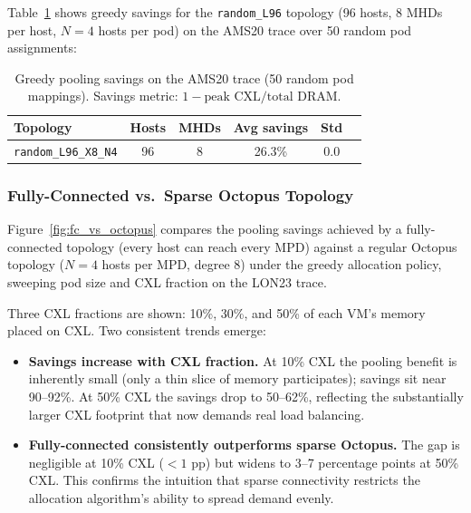 \documentclass[11pt]{article}
\begin{document}
Table~\ref{tab:random96} shows greedy savings for the \texttt{random\_L96}
topology (96 hosts, 8 MHDs per host, $N=4$ hosts per pod) on the AMS20 trace
over 50 random pod assignments:

\begin{table}[H]
\centering
\small
\begin{tabular}{lccccc}
\toprule
\textbf{Topology} & \textbf{Hosts} & \textbf{MHDs} & \textbf{Avg savings} & \textbf{Std} \\
\midrule
\texttt{random\_L96\_X8\_N4} & 96 & 8 & 26.3\% & 0.0 \\
\bottomrule
\end{tabular}
\caption{Greedy pooling savings on the AMS20 trace (50 random pod mappings).
Savings metric: $1 - \text{peak CXL}/\text{total DRAM}$.}
\label{tab:random96}
\end{table}

\subsubsection*{Fully-Connected vs.\ Sparse Octopus Topology}

Figure~\ref{fig:fc_vs_octopus} compares the pooling savings achieved by a
fully-connected topology (every host can reach every MPD) against a regular
Octopus topology ($N = 4$ hosts per MPD, degree 8) under the greedy
allocation policy, sweeping pod size and CXL fraction on the LON23 trace.

Three CXL fractions are shown: 10\%, 30\%, and 50\% of each VM's memory
placed on CXL\@.  Two consistent trends emerge:

\begin{itemize}
    \item \textbf{Savings increase with CXL fraction.}  At 10\% CXL the
          pooling benefit is inherently small (only a thin slice of memory
          participates); savings sit near 90--92\%.  At 50\% CXL the savings
          drop to 50--62\%, reflecting the substantially larger CXL footprint
          that now demands real load balancing.

    \item \textbf{Fully-connected consistently outperforms sparse Octopus.}
          The gap is negligible at 10\% CXL ($< 1$ pp) but widens to
          3--7 percentage points at 50\% CXL\@.  This confirms the intuition
          that sparse connectivity restricts the allocation algorithm's
          ability to spread demand evenly.
\end{itemize}
\end{document}
